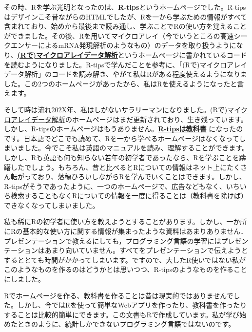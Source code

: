 \documentclass[
  letterpaper,
  DIV=11,
  numbers=noendperiod]{scrreprt}
\begin{document}
その時、Rを学ぶ光明となったのは、\textbf{R-tips}というホームページでした。R-tipsはデザインこそ昔ながらのHTMLでしたが、Rを一から学ぶための情報がすべて含まれており、始めから最後まで読み通し、学ぶことでRの使い方を覚えることができました。その後、Rを用いてマイクロアレイ（今でいうところの高速シークエンサーによるmRNA発現解析のようなもの）のデータを取り扱うようになり、\href{https://www.iu.a.u-tokyo.ac.jp/~kadota/r.html}{\textbf{(Rで)マイクロアレイデータ解析}}というホームページに書かれているコードを読むようになりました。R-tipsで学んだことを参考に、「(Rで)マイクロアレイデータ解析」のコードを読み解き、やがて私はRがある程度使えるようになりました。この2つのホームページがあったから、私はRを使えるようになったと言えます。

そして時は流れ202X年、私はしがないサラリーマンになりました。\href{https://www.iu.a.u-tokyo.ac.jp/~kadota/r.html}{(Rで)マイクロアレイデータ解析}のホームページはまだ更新されており、生き残っています。しかし、R-tipsのホームページはもうありません。\href{https://www.amazon.co.jp/R-Tips-\%E7\%AC\%AC3\%E7\%89\%88-\%E3\%83\%87\%E3\%83\%BC\%E3\%82\%BF\%E8\%A7\%A3\%E6\%9E\%90\%E7\%92\%B0\%E5\%A2\%83R\%E3\%81\%AE\%E5\%9F\%BA\%E6\%9C\%AC\%E6\%8A\%80\%E3\%83\%BB\%E3\%82\%B0\%E3\%83\%A9\%E3\%83\%95\%E3\%82\%A3\%E3\%83\%83\%E3\%82\%AF\%E3\%82\%B9\%E6\%B4\%BB\%E7\%94\%A8\%E9\%9B\%86/dp/4274219585}{\textbf{R-tipsは教科書}}
になったのです。日本語でどこでも読めて、Rを一から学べるホームページはなくなってしまいました。今でこそ私は英語のマニュアルを読み、理解することができます。しかし、Rも英語も何も知らない若年の初学者であったなら、Rを学ぶことを躊躇したでしょう。もちろん、昔と比べるとRについての情報はネット上にたくさん転がっており、落穂ひろいしながらRを学んでいくことはできます。しかし、R-tipsがそうであったように、一つのホームページで、広告などもなく、いちいち検索することもなくRについての情報を一度に得ることは（教科書を除けば）できなくなってしまいました。

私も稀にRの初学者に使い方を教えようとすることがあります。しかし、一か所にRの基本的な使い方に関する情報が集まったような資料はあまりありません．プレゼンテーションで教えるにしても，プログラミング言語の学習にはプレゼンテーションはあまり向いていません。すべてをプレゼンテーションで伝えようとするととても時間がかかってしまいます。ですので、大したR使いではない私がこのようなものを作るのはどうかとは思いつつ、R-tipsのようなものを作ることにしました。

Rでホームページを作る、教科書を作ることは昔は現実的ではありませんでした。しかし、今ではRを使って簡単なWebアプリを作ったり、教科書を作ったりすることは比較的簡単にできます。この文書もRで作成しています。私が学び始めたときのように、統計しかできないプログラミング言語ではないのです。
\end{document}
